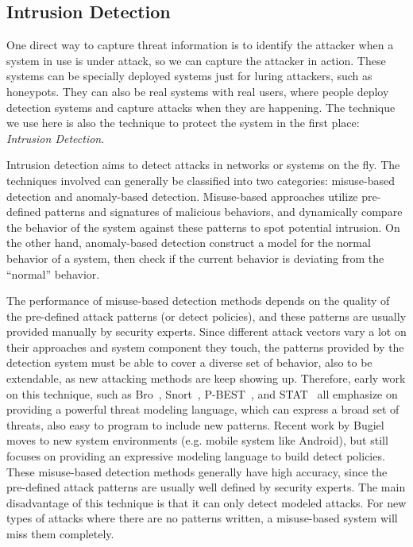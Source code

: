 \subsection{Intrusion Detection}

One direct way to capture threat information is to identify the attacker 
when a system in use is under attack, so we can capture the 
attacker in action. These systems can be specially deployed systems
just for luring attackers, such as honeypots. They can also be real systems
with real users, where people deploy detection systems and capture 
attacks when they are happening. The technique we use here is also 
the technique to protect the system in the first place:
\textit{Intrusion Detection}.

Intrusion detection aims to detect attacks in networks or systems on the
fly. The techniques involved can generally be classified into two 
categories: misuse-based detection and anomaly-based detection.
Misuse-based approaches utilize pre-defined patterns and signatures
of malicious behaviors, and dynamically compare the behavior of the
system against these patterns to spot potential intrusion. On the other
hand, anomaly-based detection construct a model for the normal behavior 
of a system, then check if the current behavior is deviating from the 
``normal'' behavior.

The performance of misuse-based detection methods depends on the quality
of the pre-defined attack patterns (or detect policies), and these 
patterns are usually provided manually by security experts. Since 
different attack vectors vary a lot on their approaches and system 
component they touch, the 
patterns provided by the detection system must be able to cover a 
diverse set of behavior, also to be extendable, as new attacking
methods are keep showing up. Therefore, early work on this technique, 
such as Bro~\cite{paxson1999bro}, Snort~\cite{roesch1999snort}, 
P-BEST~\cite{lindqvist1999detecting}, and STAT~\cite{vigna2003designing}
all emphasize on providing a powerful threat modeling language, which
can express a broad set of threats, also easy to program to include new 
patterns. Recent work by Bugiel~\etal~\cite{bugiel2012towards} moves to 
new system environments (e.g. mobile system like Android), but still focuses
on providing an expressive modeling language to build detect policies. 
These misuse-based detection methods generally have high accuracy, since the
pre-defined attack patterns are usually well defined by security experts. 
The main disadvantage of this technique is that it can only detect 
modeled attacks. For new types of attacks where there are no patterns
written, a misuse-based system will miss them completely.

